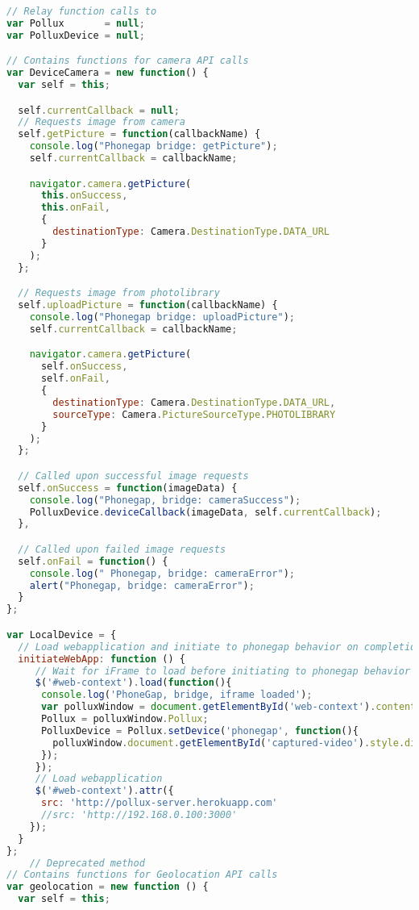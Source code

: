 \begin{lstlisting}[language=JavaScript]
// Relay function calls to
var Pollux       = null;
var PolluxDevice = null;

// Contains functions for camera API calls
var DeviceCamera = new function() {
  var self = this;

  self.currentCallback = null;
  // Requests image from camera
  self.getPicture = function(callbackName) {
    console.log("Phonegap bridge: getPicture");
    self.currentCallback = callbackName;

    navigator.camera.getPicture(
      this.onSuccess,
      this.onFail,
      {
        destinationType: Camera.DestinationType.DATA_URL
      }
    );
  };

  // Requests image from photolibrary
  self.uploadPicture = function(callbackName) {
    console.log("Phonegap bridge: uploadPicture");
    self.currentCallback = callbackName;

    navigator.camera.getPicture(
      self.onSuccess,
      self.onFail,
      {
        destinationType: Camera.DestinationType.DATA_URL,
        sourceType: Camera.PictureSourceType.PHOTOLIBRARY
      }
    );
  };

  // Called upon successful image requests
  self.onSuccess = function(imageData) {
    console.log("Phonegap, bridge: cameraSuccess");
    PolluxDevice.deviceCallback(imageData, self.currentCallback);
  },

  // Called upon failed image requests
  self.onFail = function() {
    console.log(" Phonegap, bridge: cameraError");
    alert("Phonegap, bridge: cameraError");
  }
};

var LocalDevice = {
  // Load webapplication and initiate to phonegap behavior on completion
  initiateWebApp: function () {
     // Wait for iFrame to load before initiating to phonegap behavior
     $('#web-context').load(function(){
      console.log('PhoneGap, bridge, iframe loaded');
      var polluxWindow = document.getElementById('web-context').contentWindow;
      Pollux = polluxWindow.Pollux;
      PolluxDevice = Pollux.setDevice('phonegap', function(){
        polluxWindow.document.getElementById('captured-video').style.display = "none";
      });
     });
     // Load webapplication
     $('#web-context').attr({
      src: 'http://pollux-server.herokuapp.com'
      //src: 'http://192.168.0.100:3000'
    });
  }
};
    // Deprecated method
// Contains functions for Geolocation API calls
var geolocation = new function () {
  var self = this;


\end{lstlisting}
